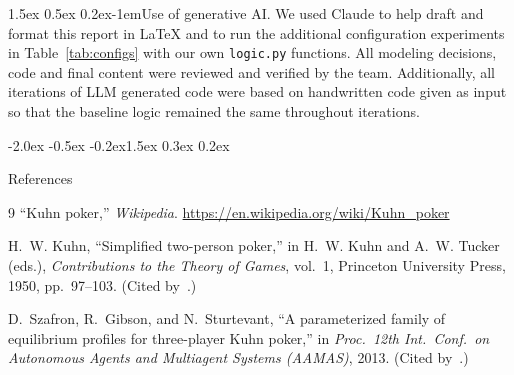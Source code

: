 \documentclass{article}
\makeatletter
\renewcommand{\section}{\@startsection{section}{1}{\z@}%
    {-2.0ex \@plus -0.5ex \@minus -0.2ex}{1.5ex \@plus 0.3ex \@minus 0.2ex}%
    {\large\bf\raggedright}}
\renewcommand{\paragraph}{\@startsection{paragraph}{4}{\z@}%
    {1.5ex \@plus 0.5ex \@minus 0.2ex}{-1em}{\normalsize\bf}}
\newcommand{\code}[1]{\texttt{#1}}
\makeatother
\begin{document}
\paragraph{Use of generative AI.} 
We used Claude to help draft and format this report in LaTeX and to run the additional configuration experiments in Table~\ref{tab:configs} with our own \code{logic.py} functions. All modeling decisions, code and final content were reviewed and verified by the team. Additionally, all iterations of LLM generated code were based on handwritten code given as input so that the baseline logic remained the same throughout iterations.



\section{References}
{\renewcommand{\section}[2]{}%
\begin{thebibliography}{9}
\small
{}
``Kuhn poker,'' \emph{Wikipedia}.
\url{https://en.wikipedia.org/wiki/Kuhn_poker}

H.~W. Kuhn, ``Simplified two-person poker,'' in H.~W. Kuhn and A.~W. Tucker
(eds.), \emph{Contributions to the Theory of Games}, vol.~1, Princeton
University Press, 1950, pp.~97--103. (Cited by~\cite{wiki}.)

D.~Szafron, R.~Gibson, and N.~Sturtevant, ``A parameterized family of
equilibrium profiles for three-player Kuhn poker,'' in \emph{Proc.\ 12th Int.\
Conf.\ on Autonomous Agents and Multiagent Systems (AAMAS)}, 2013. (Cited
by~\cite{wiki}.)
\end{thebibliography}}
\end{document}
